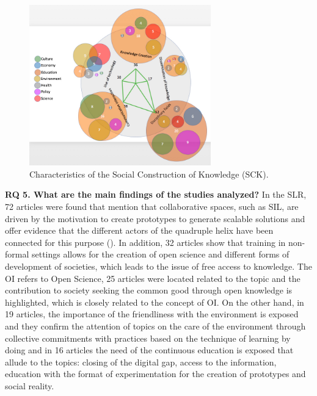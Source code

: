 \documentclass[english]{textolivre}
\begin{document}
\begin{figure}[htbp]
 \centering
 \includegraphics[width=0.7\textwidth]{fig4-33750.jpg}
 \caption{Characteristics of the Social Construction of Knowledge (SCK).}
 \label{fig4}
\end{figure}

\textbf{RQ 5. What are the main findings of the studies analyzed?} In the SLR, 72 articles were found that mention that collaborative spaces, such as SIL, are driven by the motivation to create prototypes to generate scalable solutions and offer evidence that the different actors of the quadruple helix have been connected for this purpose (). In addition, 32 articles show that training in non-formal settings allows for the creation of open science and different forms of development of societies, which leads to the issue of free access to knowledge. The OI refers to Open Science, 25 articles were located related to the topic and the contribution to society seeking the common good through open knowledge is highlighted, which is closely related to the concept of OI. On the other hand, in 19 articles, the importance of the friendliness with the environment is exposed and they confirm the attention of topics on the care of the environment through collective commitments with practices based on the technique of learning by doing and in 16 articles the need of the continuous education is exposed that allude to the topics: closing of the digital gap, access to the information, education with the format of experimentation for the creation of prototypes and social reality.
\end{document}

